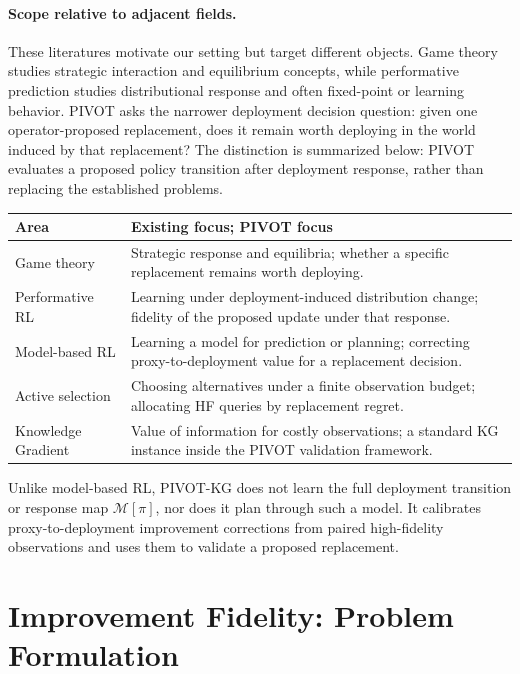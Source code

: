 \documentclass{article}
\newcommand{\M}{\mathcal{M}}
\begin{document}
\paragraph{Scope relative to adjacent fields.}
These literatures motivate our setting but target different objects. Game
theory studies strategic interaction and equilibrium concepts, while
performative prediction studies distributional response and often fixed-point
or learning behavior. PIVOT asks the narrower deployment decision question:
given one operator-proposed replacement, does it remain worth deploying in the
world induced by that replacement? The
distinction is summarized below: PIVOT evaluates a proposed policy transition
after deployment response, rather than replacing the established problems.
\begin{center}
\scriptsize
\setlength{\tabcolsep}{3pt}
\renewcommand{\arraystretch}{0.92}
\begin{tabular}{@{}p{}p{}@{}}
\toprule
Area & Existing focus; PIVOT focus \\
\midrule
Game theory & Strategic response and equilibria; whether a specific replacement remains worth deploying. \\
Performative RL & Learning under deployment-induced distribution change; fidelity of the proposed update under that response. \\
Model-based RL & Learning a model for prediction or planning; correcting proxy-to-deployment value for a replacement decision. \\
Active selection & Choosing alternatives under a finite observation budget; allocating HF queries by replacement regret. \\
Knowledge Gradient & Value of information for costly observations; a standard KG instance inside the PIVOT validation framework. \\
\bottomrule
\end{tabular}
\end{center}

Unlike model-based RL, PIVOT-KG does not learn the full deployment transition
or response map $\M[\pi]$, nor does it plan through such a model. It calibrates
proxy-to-deployment improvement corrections from paired high-fidelity
observations and uses them to validate a proposed replacement.


\section{Improvement Fidelity: Problem Formulation}
\end{document}
